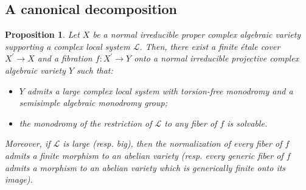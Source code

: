 \documentclass[11pt,letterpaper]{amsart}
\def\cL{\mathcal{L}}
\theoremstyle{plain}
\newtheorem{prop}[thm]{Proposition}
\begin{document}



\subsection{A canonical decomposition}


\begin{prop}\label{fibration solvable/semisimple}
Let $X$ be a normal irreducible proper complex algebraic variety supporting a complex local system $\cL$. Then, there exist a finite étale cover $X^\prime \to X$ and a fibration $f \colon X^\prime \to Y$ onto a normal irreducible projective complex algebraic variety $Y$ such that:
\begin{itemize}
\item $Y$ admits a large complex local system with torsion-free monodromy and a semisimple algebraic monodromy group;
\item the monodromy of the restriction of $\cL$ to any fiber of $f$ is solvable.
\end{itemize} 
Moreover, if $\cL$ is large (resp. big), then the normalization of every fiber of $f$ admits a finite morphism to an abelian variety (resp. every generic fiber of $f$ admits a morphism to an abelian variety which is generically finite onto its image).
\end{prop}
\end{document}
